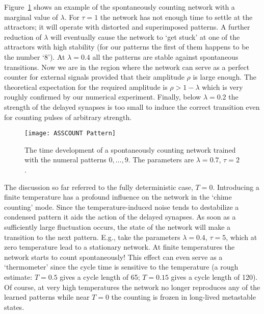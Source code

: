 Figure~\ref{ASSCOUNTPattern} shows an example of the spontaneously counting network with a marginal value of $\lambda$. For $\tau=1$ the network has not enough time to settle at the attractors; it will operate with distorted and superimposed patterns. A further reduction of $\lambda$ will eventually cause the network to `get stuck' at one of the attractors with high stability (for our patterns the first of them happens to be the number `8'). At $\lambda=0.4$ all the patterns are stable against spontaneous transitions. Now we are in the region where the network can serve as a perfect counter for external signals provided that their amplitude $\rho$ is large enough. The theoretical expectation for the required amplitude is $\rho>1-\lambda$ which is very roughly confirmed by our numerical experiment. Finally, below $\lambda=0.2$ the strength of the delayed synapses is too small to induce the correct transition even for counting pulses of arbitrary strength.
\begin{figure}[h!t]
\centering
\texttt{[image: ASSCOUNT Pattern]}
\caption{The time development of a spontaneously counting network trained with the numeral patterns $0,\ldots,9$. The parameters are $\lambda=0.7$, $\tau=2$.}\label{ASSCOUNTPattern}
\end{figure}

The discussion so far referred to the fully deterministic case, $T=0$. Introducing a finite temperature has a profound influence on the network in the `chime counting' mode. Since the temperature-induced noise tends to destabilize a condensed pattern it aids the action of the delayed synapses. As soon as a sufficiently large fluctuation occurs, the state of the network will make a transition to the next pattern. E.g., take the parameters $\lambda=0.4$, $\tau=5$, which at zero temperature lead to a stationary network. At finite temperatures the network starts to count spontaneously! This effect can even serve as a `thermometer' since the cycle time is sensitive to the temperature (a rough estimate: $T=0.5$ gives a cycle length of 65; $T=0.15$ gives a cycle length of 120). Of course, at very high temperatures the network no longer reproduces any of the learned patterns while near $T=0$ the counting is frozen in long-lived metastable states.
